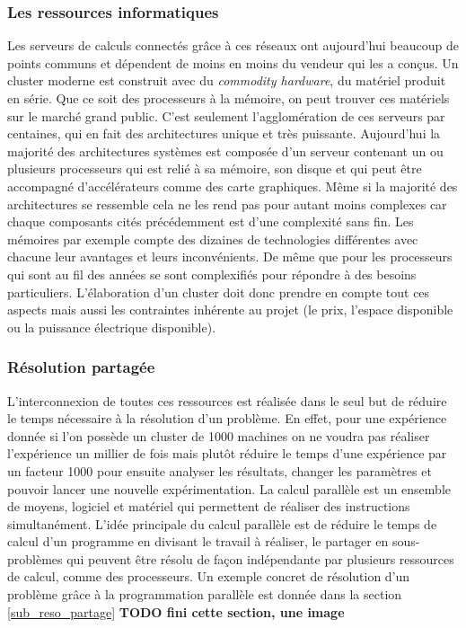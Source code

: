 
\subsubsection{Les ressources informatiques} 
Les serveurs de calculs connectés grâce à ces réseaux ont aujourd'hui beaucoup de points communs et dépendent de moins en moins du vendeur qui les a conçus. Un cluster moderne est construit avec du \textit{commodity hardware}, du matériel produit en série. Que ce soit des processeurs à la mémoire, on peut trouver ces matériels sur le marché grand public. C'est seulement l'agglomération de ces serveurs par centaines, qui en fait des architectures unique et très puissante. Aujourd'hui la majorité des architectures systèmes est composée d'un serveur contenant un ou plusieurs processeurs qui est relié à sa mémoire, son disque et qui peut être accompagné d'accélérateurs comme des carte graphiques. Même si la majorité des architectures se ressemble cela ne les rend pas pour autant moins complexes car chaque composants cités précédemment est d'une complexité sans fin. Les mémoires par exemple compte des dizaines de technologies différentes avec chacune leur avantages et leurs inconvénients. De même que pour les processeurs qui sont au fil des années se sont complexifiés pour répondre à des besoins particuliers. L'élaboration d'un cluster doit donc prendre en compte tout ces aspects mais aussi les contraintes inhérente au projet (le prix, l'espace disponible ou la puissance électrique disponible). 

\subsubsection{Résolution partagée}
L'interconnexion de toutes ces ressources est réalisée dans le seul but de réduire le temps nécessaire à la résolution d'un problème. En effet, pour une expérience donnée si l'on possède un cluster de 1000 machines on ne voudra pas réaliser l'expérience un millier de fois mais plutôt réduire le temps d'une expérience par un facteur 1000 pour ensuite analyser les résultats, changer les paramètres et pouvoir lancer une nouvelle expérimentation. La calcul parallèle est un ensemble de moyens, logiciel et matériel qui permettent de réaliser des instructions simultanément. L'idée principale du calcul parallèle est de réduire le temps de calcul d'un programme en divisant le travail à réaliser, le partager en sous-problèmes qui peuvent être résolu de façon indépendante par plusieurs ressources de calcul, comme des processeurs. Un exemple concret de résolution d'un problème grâce à la programmation parallèle est donnée dans la section \ref{sub_reso_partage}
\textbf{TODO fini cette section, une image}


